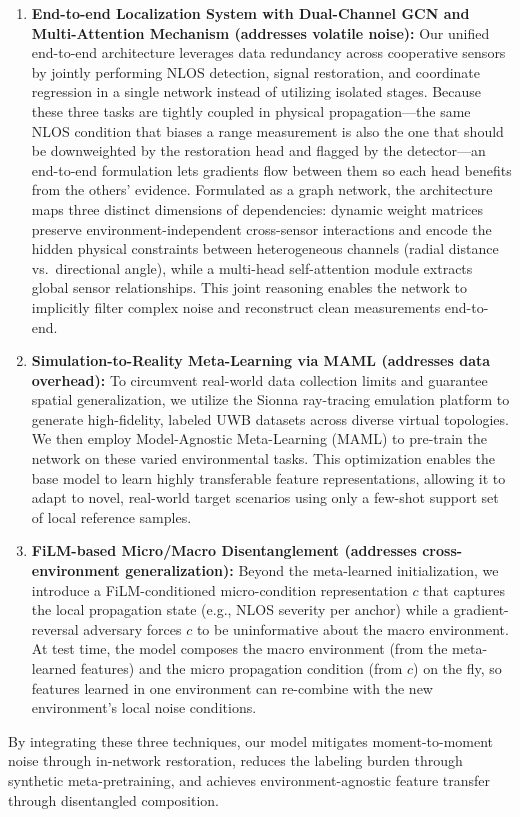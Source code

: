 \documentclass[11pt]{article}
\begin{document}
\begin{enumerate}
  \item \textbf{End-to-end Localization System with Dual-Channel GCN and Multi-Attention Mechanism (addresses volatile noise):} Our unified end-to-end architecture leverages data redundancy across cooperative sensors by jointly performing NLOS detection, signal restoration, and coordinate regression in a single network instead of utilizing isolated stages. Because these three tasks are tightly coupled in physical propagation---the same NLOS condition that biases a range measurement is also the one that should be downweighted by the restoration head and flagged by the detector---an end-to-end formulation lets gradients flow between them so each head benefits from the others' evidence. Formulated as a graph network, the architecture maps three distinct dimensions of dependencies: dynamic weight matrices preserve environment-independent cross-sensor interactions and encode the hidden physical constraints between heterogeneous channels (radial distance vs.\ directional angle), while a multi-head self-attention module extracts global sensor relationships. This joint reasoning enables the network to implicitly filter complex noise and reconstruct clean measurements end-to-end.

  \item \textbf{Simulation-to-Reality Meta-Learning via MAML (addresses data overhead):} To circumvent real-world data collection limits and guarantee spatial generalization, we utilize the Sionna ray-tracing emulation platform to generate high-fidelity, labeled UWB datasets across diverse virtual topologies. We then employ Model-Agnostic Meta-Learning (MAML) to pre-train the network on these varied environmental tasks. This optimization enables the base model to learn highly transferable feature representations, allowing it to adapt to novel, real-world target scenarios using only a few-shot support set of local reference samples.

  \item \textbf{FiLM-based Micro/Macro Disentanglement (addresses cross-environment generalization):} Beyond the meta-learned initialization, we introduce a FiLM-conditioned micro-condition representation $c$ that captures the local propagation state (e.g., NLOS severity per anchor) while a gradient-reversal adversary forces $c$ to be uninformative about the macro environment. At test time, the model composes the macro environment (from the meta-learned features) and the micro propagation condition (from $c$) on the fly, so features learned in one environment can re-combine with the new environment's local noise conditions.
\end{enumerate}

\noindent By integrating these three techniques, our model mitigates moment-to-moment noise through in-network restoration, reduces the labeling burden through synthetic meta-pretraining, and achieves environment-agnostic feature transfer through disentangled composition.
\end{document}
